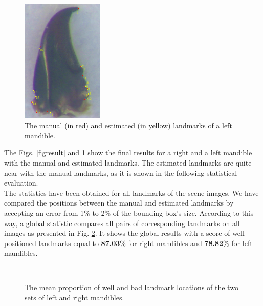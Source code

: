 \documentclass[twoside,twocolumn,10pt]{article}
\begin{document}
\begin{figure}[h]
\centering
\includegraphics[width=0.35\textwidth]{./images/mg_rs}
\caption{The manual (in red) and estimated (in yellow) landmarks of a left mandible.}
\label{figresult2}
\end{figure}

The Figs. \ref{figresult} and \ref{figresult2} show the final results
for a right and a left mandible with the manual and estimated
landmarks. The estimated landmarks are quite near with the manual
landmarks, as it is shown in the following statistical evaluation.
\\
The statistics have been obtained for all landmarks of the scene images.
We have compared the positions between the manual and estimated
landmarks by accepting an error from 1\% to 2\% of the bounding box's
size. According to this way, a global statistic compares all pairs of
corresponding landmarks on all images as presented in
Fig. \ref{figctresult}. It shows the global results with a score of
well positioned landmarks equal to \textbf{87.03}\% for right
mandibles and \textbf{78.82}\% for left mandibles.

\begin{figure}[h]
\centering
{}~~
\caption{The mean proportion of well and bad landmark locations of the two sets of left and right mandibles.}
\label{figctresult}
\end{figure}
\end{document}

